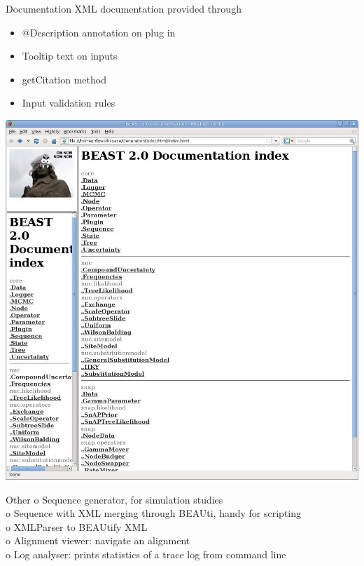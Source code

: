 \documentclass{beamer}
\theoremstyle{definition}
\begin{document}
\begin{frame}{Documentation}
XML documentation provided through

\begin{itemize}
\item @Description annotation on plug in
\item Tooltip text on inputs
\item getCitation method
\item Input validation rules
\end{itemize}

\includegraphics[width=\textwidth]{beastdoc0.png}

\end{frame}


\begin{frame}{Other}
o Sequence generator, for simulation studies\\\vskip0.5cm
o Sequence with XML merging through BEAUti, handy for scripting\\\vskip0.5cm
o XMLParser to BEAUtify XML\\\vskip0.5cm
o Alignment viewer: navigate an alignment\\\vskip0.5cm
o Log analyser: prints statistics of a trace log from command line \\\vskip0.5cm
\end{frame}
\end{document}
